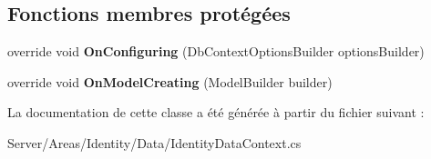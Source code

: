\subsection*{Fonctions membres protégées}
\begin{DoxyCompactItemize}
\item 
\mbox{\label{class_mediwatch_1_1_server_1_1_areas_1_1_identity_1_1_data_1_1_identity_data_context_a40eef85ff099940e6bb3fb2e5eda041f}} 
override void {\bfseries On\+Configuring} (Db\+Context\+Options\+Builder options\+Builder)
\item 
\mbox{\label{class_mediwatch_1_1_server_1_1_areas_1_1_identity_1_1_data_1_1_identity_data_context_aa038bee1336ce8e66954bc5cfdc52e7a}} 
override void {\bfseries On\+Model\+Creating} (Model\+Builder builder)
\end{DoxyCompactItemize}


La documentation de cette classe a été générée à partir du fichier suivant \+:\begin{DoxyCompactItemize}
\item 
Server/\+Areas/\+Identity/\+Data/Identity\+Data\+Context.\+cs\end{DoxyCompactItemize}
